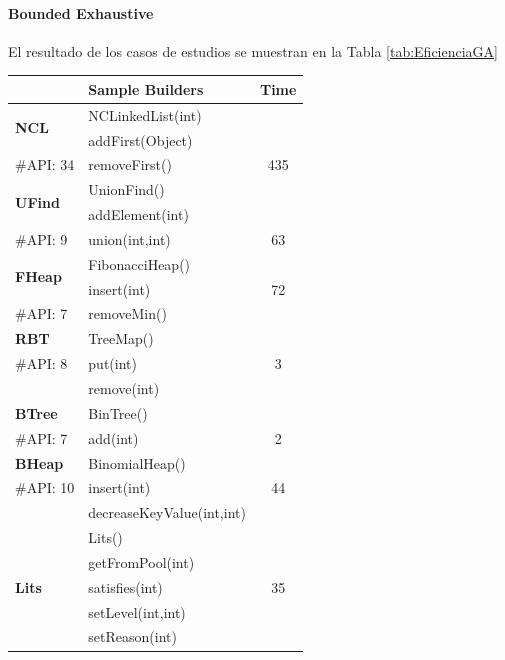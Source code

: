 \paragraph{Bounded Exhaustive}
El resultado de los casos de estudios se muestran en la Tabla \ref{tab:EficienciaGA} 
\begin{table}[t!]
\centering
{\scriptsize
\begin{tabular}{l l c}
\hline
&Sample Builders & Time \\
\hline
\multirow{2}{*}{\textbf{NCL}} 
 & NCLinkedList(int) & \\
 & addFirst(Object) &   \\
 {\scriptsize \#API: 34} & removeFirst() & 435 \\
\hline

\multirow{2}{*}{\textbf{UFind}} 
 & UnionFind() & \\
 & addElement(int) &  \\
 {\scriptsize \#API: 9} & union(int,int) & 63 \\
\hline

\multirow{2}{*}{\textbf{FHeap}} 
 & FibonacciHeap() & \\
 & insert(int) & 72 \\
 {\scriptsize \#API: 7} & removeMin() &  \\
\hline

\multirow{1}{*}{\textbf{RBT}} 
 & TreeMap() & \\
 {\scriptsize \#API: 8} & put(int) & 3 \\
 & remove(int) &   \\
\hline

\multirow{1}{*}{\textbf{BTree}} 
 & BinTree() & \\
 {\scriptsize \#API: 7} & add(int) & 2 \\
\hline

\multirow{1}{*}{\textbf{BHeap}} 
 & BinomialHeap() & \\
 {\scriptsize \#API: 10} & insert(int) & 44 \\
 & decreaseKeyValue(int,int) &  \\
\hline

\multirow{5}{*}{\textbf{Lits}} 
 & Lits() & \\
 & getFromPool(int) & \\
 & satisfies(int) & 35 \\
 {\scriptsize \#API: 26} & setLevel(int,int) & \\
 & setReason(int) & \\
\hline


\end{tabular}}
\end{table}
